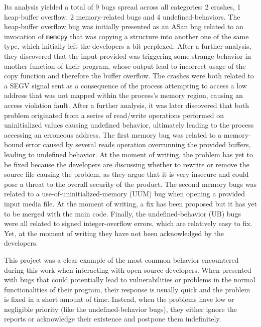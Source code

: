 Its analysis yielded a total of 9 bugs spread across all categories: 2 crashes, 1 heap-buffer overflow, 2 memory-related bugs and 4 undefined-behaviors.
The heap-buffer overflow bug was initially presented as an ASan bug related to an invocation of \verb|memcpy| that was copying a structure into another one of the same type, which initially left the developers a bit perplexed. After a further analysis, they discovered that the input provided was triggering some strange behavior in another function of their program, whose output lead to incorrect usage of the copy function and therefore the buffer overflow.
The crashes were both related to a SEGV signal sent as a consequence of the process attempting to access a low address that was not mapped within the process's memory region, causing an access violation fault. After a further analysis, it was later discovered that both problem originated from a series of read/write operations performed on uninitialized values causing undefined behavior, ultimately leading to the process accessing an erroneous address.
The first memory bug was related to a memory-bound error caused by several reads operation overrunning the provided buffers, leading to undefined behavior. At the moment of writing, the problem has yet to be fixed because the developers are discussing whether to rewrite or remove the source file causing the problem, as they argue that it is very insecure and could pose a threat to the overall security of the product.
The second memory bugs was related to a use-of-uninitialized-memory (UUM) bug when opening a provided input media file. At the moment of writing, a fix has been proposed but it has yet to be merged with the main code.
Finally, the undefined-behavior (UB) bugs were all related to signed integer-overflow errors, which are relatively easy to fix. Yet, at the moment of writing they have not been acknowledged by the developers.

This project was a clear example of the most common behavior encountered during this work when interacting with open-source developers.
When presented with bugs that could potentially lead to vulnerabilities or problems in the normal functionalities of their program, their response is usually quick and the problem is fixed in a short amount of time. 
Instead, when the problems have low or negligible priority (like the undefined-behavior bugs), they either ignore the reports or acknowledge their existence and postpone them indefinitely. 




